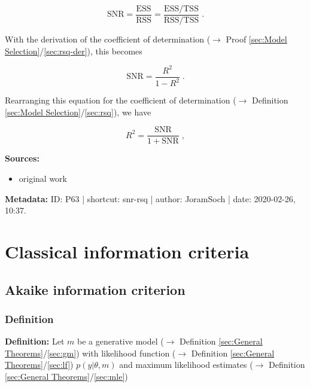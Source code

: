 \documentclass[a4paper,12pt,twoside]{book}
\begin{document}
\begin{equation} \label{eq:snr-rsq-SNR-s3}
\mathrm{SNR} = \frac{\mathrm{ESS}}{\mathrm{RSS}} = \frac{\mathrm{ESS}/\mathrm{TSS}}{\mathrm{RSS}/\mathrm{TSS}} \; .
\end{equation}

With the derivation of the coefficient of determination ($\rightarrow$ Proof \ref{sec:Model Selection}/\ref{sec:rsq-der}), this becomes

\begin{equation} \label{eq:snr-rsq-SNR-R2-qed}
\mathrm{SNR} = \frac{R^2}{1-R^2} \; .
\end{equation}

Rearranging this equation for the coefficient of determination ($\rightarrow$ Definition \ref{sec:Model Selection}/\ref{sec:rsq}), we have

\begin{equation} \label{eq:snr-rsq-R2-SNR-qed}
R^2 = \frac{\mathrm{SNR}}{\mathrm{1+\mathrm{SNR}}} \; ,
\end{equation}


\vspace{1em}
\textbf{Sources:}
\begin{itemize}
\item original work\end{itemize}


\vspace{1em}
\textbf{Metadata:} ID: P63 | shortcut: snr-rsq | author: JoramSoch | date: 2020-02-26, 10:37.
\vspace{1em}



\pagebreak
\section{Classical information criteria}

\subsection{Akaike information criterion}

\subsubsection[\textit{Definition}]{Definition} \label{sec:aic}
\setcounter{equation}{0}

\textbf{Definition:} Let $m$ be a generative model ($\rightarrow$ Definition \ref{sec:General Theorems}/\ref{sec:gm}) with likelihood function ($\rightarrow$ Definition \ref{sec:General Theorems}/\ref{sec:lf}) $p(y \vert \theta, m)$ and maximum likelihood estimates ($\rightarrow$ Definition \ref{sec:General Theorems}/\ref{sec:mle})
\end{document}
